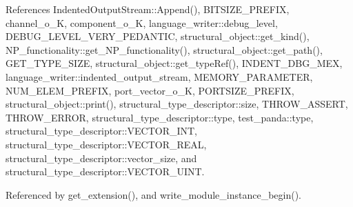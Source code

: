 References Indented\+Output\+Stream\+::\+Append(), B\+I\+T\+S\+I\+Z\+E\+\_\+\+P\+R\+E\+F\+IX, channel\+\_\+o\+\_\+K, component\+\_\+o\+\_\+K, language\+\_\+writer\+::debug\+\_\+level, D\+E\+B\+U\+G\+\_\+\+L\+E\+V\+E\+L\+\_\+\+V\+E\+R\+Y\+\_\+\+P\+E\+D\+A\+N\+T\+IC, structural\+\_\+object\+::get\+\_\+kind(), N\+P\+\_\+functionality\+::get\+\_\+\+N\+P\+\_\+functionality(), structural\+\_\+object\+::get\+\_\+path(), G\+E\+T\+\_\+\+T\+Y\+P\+E\+\_\+\+S\+I\+ZE, structural\+\_\+object\+::get\+\_\+type\+Ref(), I\+N\+D\+E\+N\+T\+\_\+\+D\+B\+G\+\_\+\+M\+EX, language\+\_\+writer\+::indented\+\_\+output\+\_\+stream, M\+E\+M\+O\+R\+Y\+\_\+\+P\+A\+R\+A\+M\+E\+T\+ER, N\+U\+M\+\_\+\+E\+L\+E\+M\+\_\+\+P\+R\+E\+F\+IX, port\+\_\+vector\+\_\+o\+\_\+K, P\+O\+R\+T\+S\+I\+Z\+E\+\_\+\+P\+R\+E\+F\+IX, structural\+\_\+object\+::print(), structural\+\_\+type\+\_\+descriptor\+::size, T\+H\+R\+O\+W\+\_\+\+A\+S\+S\+E\+RT, T\+H\+R\+O\+W\+\_\+\+E\+R\+R\+OR, structural\+\_\+type\+\_\+descriptor\+::type, test\+\_\+panda\+::type, structural\+\_\+type\+\_\+descriptor\+::\+V\+E\+C\+T\+O\+R\+\_\+\+I\+NT, structural\+\_\+type\+\_\+descriptor\+::\+V\+E\+C\+T\+O\+R\+\_\+\+R\+E\+AL, structural\+\_\+type\+\_\+descriptor\+::vector\+\_\+size, and structural\+\_\+type\+\_\+descriptor\+::\+V\+E\+C\+T\+O\+R\+\_\+\+U\+I\+NT.



Referenced by get\+\_\+extension(), and write\+\_\+module\+\_\+instance\+\_\+begin().

